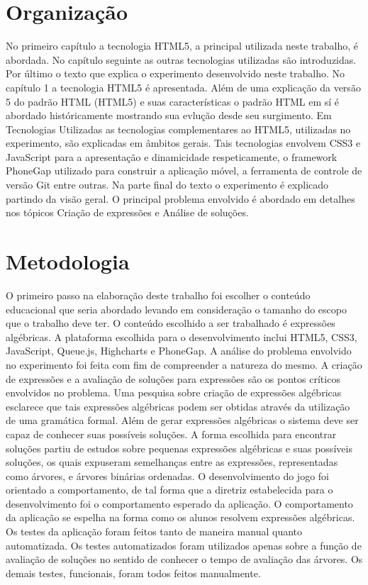 \section{Organização}
No primeiro capítulo a tecnologia HTML5, a principal utilizada neste trabalho, é abordada. No capítulo seguinte as outras tecnologias utilizadas são introduzidas. Por último o texto que explica o experimento desenvolvido neste trabalho.
	No capítulo 1 a tecnologia HTML5 é apresentada. Além de uma explicação da versão 5 do padrão HTML (HTML5) e suas características o padrão HTML em sí é abordado históricamente mostrando sua evlução desde seu surgimento.
	Em Tecnologias Utilizadas as tecnologias complementares ao HTML5, utilizadas no experimento, são  explicadas em âmbitos gerais. Tais tecnologias envolvem CSS3 e JavaScript para a apresentação e dinamicidade respeticamente, o framework PhoneGap utilizado para construir a aplicação móvel, a ferramenta de controle de versão Git entre outras.
	Na parte final do texto o experimento é explicado partindo da visão geral. O principal problema envolvido é abordado em detalhes nos tópicos Criação de expressões e Análise de soluções.
	
\section{Metodologia}
O primeiro passo na elaboração deste trabalho foi escolher o conteúdo educacional que seria abordado levando em consideração o tamanho do escopo que o trabalho deve ter. O conteúdo escolhido a ser trabalhado é expressões algébricas.
	A plataforma escolhida para o desenvolvimento inclui HTML5, CSS3, JavaScript, Queue.js, Highcharts e PhoneGap.
	A análise do problema envolvido no experimento foi feita com fim de compreender a natureza do mesmo. A criação de expressões e a avaliação de soluções para expressões são os pontos críticos envolvidos no problema. Uma pesquisa sobre criação de expressões algébricas esclarece que tais expressões algébricas podem ser obtidas através da utilização de uma gramática formal.
	Além de gerar expressões algébricas o sistema deve ser capaz de conhecer suas possíveis soluções. A forma escolhida para encontrar soluções partiu de estudos sobre pequenas expressões algébricas e suas possíveis soluções, os quais expuseram semelhanças entre as expressões, representadas como árvores, e árvores binárias ordenadas.
	O desenvolvimento do jogo foi orientado a comportamento, de tal forma que a diretriz estabelecida para o desenvolvimento foi o comportamento esperado da aplicação. O comportamento da aplicação se espelha na forma como os alunos resolvem expressões algébricas.
	Os testes da aplicação foram feitos tanto de maneira manual quanto automatizada. Os testes automatizados foram utilizados apenas sobre a função de avaliação de soluções no sentido de conhecer o tempo de avaliação das árvores. Os demais testes, funcionais, foram todos feitos manualmente.
